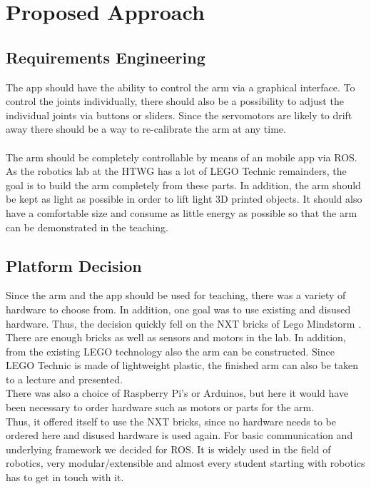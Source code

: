 \documentclass[conference]{IEEEtran}
\begin{document}
\section{Proposed Approach}\label{sec:approach}

\subsection{Requirements Engineering}\label{sec:requirements}
The app should have the ability to control the arm via a graphical interface. To control the joints individually, there should also be a possibility to adjust the individual joints via buttons or sliders. Since the servomotors are likely to drift away there should be a way to re-calibrate the arm at any time.
\\\\
The arm should be completely controllable by means of an mobile app via ROS. As the robotics lab at the HTWG has a lot of LEGO Technic remainders, the goal is to build the arm completely from these parts. In addition, the arm should be kept as light as possible in order to lift light 3D printed objects. It should also have a comfortable size and consume as little energy as possible so that the arm can be demonstrated in the teaching. 

\subsection{Platform Decision}\label{sec:platform}
Since the arm and the app should be used for teaching, there was a variety of hardware to choose from. In addition, one goal was to use existing and disused hardware. Thus, the decision quickly fell on the NXT bricks of Lego Mindstorm \cite{onlLegoMindstorm}. There are enough bricks as well as sensors and motors in the lab. In addition, from the existing LEGO technology also the arm can be constructed. Since LEGO Technic is made of lightweight plastic, the finished arm can also be taken to a lecture and presented.\\
There was also a choice of Raspberry Pi's or Arduinos, but here it would have been necessary to order hardware such as motors or parts for the arm.\\
Thus, it offered itself to use the NXT bricks, since no hardware needs to be ordered here and disused hardware is used again. For basic communication and underlying framework we decided for ROS. It is widely used in the field of robotics, very modular/extensible and almost every student starting with robotics has to get in touch with it.
\end{document}
